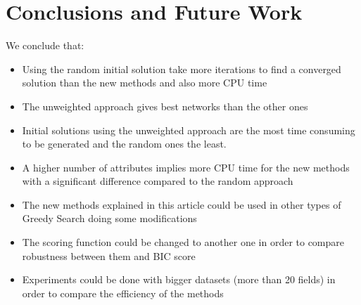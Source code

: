 \section{Conclusions and Future Work}
\label{sec:conclusions}

We conclude that:
\begin{itemize}
	\item Using the random initial solution take more iterations to find a converged solution than the new methods and also more CPU time
	\item The unweighted approach gives best networks than the other ones
	\item Initial solutions using the unweighted approach are the most time consuming to be generated and the random ones the least.
	\item A higher number of attributes implies more CPU time for the new methods with a significant difference compared to the random approach
	\item The new methods explained in this article could be used in other types of Greedy Search doing some modifications
	\item The scoring function could be changed to another one in order to compare robustness between them and BIC score
	\item Experiments could be done with bigger datasets (more than 20 fields) in order to compare the efficiency of the methods
\end{itemize}